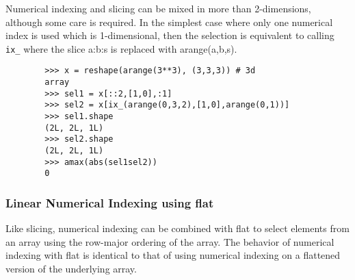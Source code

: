 \documentclass[KSmainSlides.tex]{subfiles}
\begin{document}
\begin{frame}[fragile]
	Numerical indexing and slicing can be mixed in more than 2-dimensions, although some care is required.
	In the simplest case where only one numerical index is used which is 1-dimensional, then the selection is
	equivalent to calling \texttt{ix\_} where the slice a:b:s is replaced with arange(a,b,s).
	
	
\end{frame}
\begin{frame}[fragile]	
	\begin{framed}
		\begin{verbatim}
		>>> x = reshape(arange(3**3), (3,3,3)) # 3d
		array
		>>> sel1 = x[::2,[1,0],:1]
		>>> sel2 = x[ix_(arange(0,3,2),[1,0],arange(0,1))]
		>>> sel1.shape
		(2L, 2L, 1L)
		>>> sel2.shape
		(2L, 2L, 1L)
		>>> amax(abs(sel1sel2))
		0
		\end{verbatim}
	\end{framed}
\end{frame}
\begin{frame}[fragile]	
	\frametitle*{Linear Numerical Indexing using flat}

	Like slicing, numerical indexing can be combined with flat to select elements from an array using the
	row-major ordering of the array. The behavior of numerical indexing with flat is identical to that of using
	numerical indexing on a flattened version of the underlying array.
\end{frame}
\end{document}
